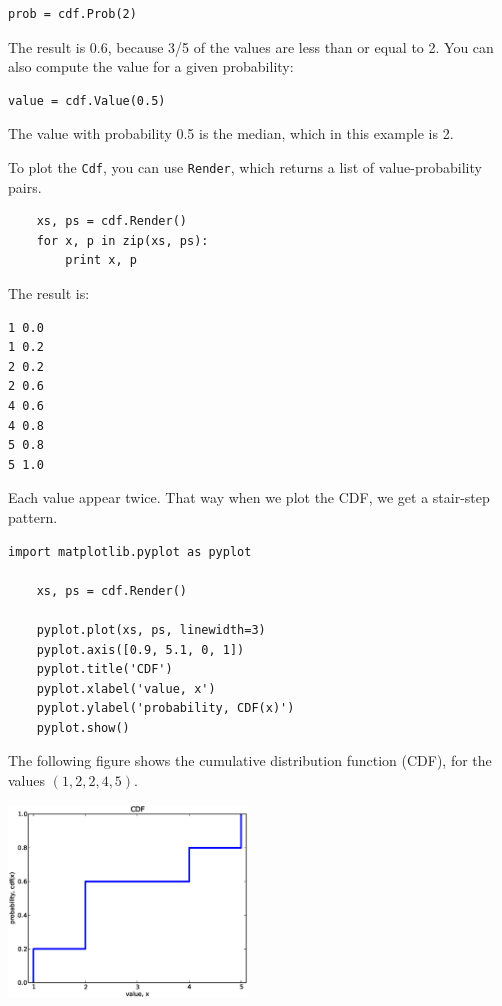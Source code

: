 \documentclass[10pt]{book}
\begin{document}
\begin{verbatim}
prob = cdf.Prob(2)
\end{verbatim}

The result is 0.6, because 3/5 of the values are less than or equal to 2.
You can also compute the value for a given probability:

\begin{verbatim}
value = cdf.Value(0.5)
\end{verbatim}

The value with probability 0.5 is the median, which in this example is 2.

To plot the {\tt Cdf}, you can use {\tt Render}, which returns
a list of value-probability pairs.

\begin{verbatim}
    xs, ps = cdf.Render()
    for x, p in zip(xs, ps):
        print x, p
\end{verbatim}

The result is:

\begin{verbatim}
1 0.0
1 0.2
2 0.2
2 0.6
4 0.6
4 0.8
5 0.8
5 1.0
\end{verbatim}

Each value appear twice.  That way when we plot the
CDF, we get a stair-step pattern.

\begin{verbatim}
import matplotlib.pyplot as pyplot

    xs, ps = cdf.Render()

    pyplot.plot(xs, ps, linewidth=3)
    pyplot.axis([0.9, 5.1, 0, 1])
    pyplot.title('CDF')
    pyplot.xlabel('value, x')
    pyplot.ylabel('probability, CDF(x)')
    pyplot.show()
\end{verbatim}

The following figure shows the cumulative distribution
function (CDF), for the values $(1,2,2,4,5)$.

\beforefig
\centerline{\includegraphics[width=2.5in]{figs/cdf_example.eps}}
\afterfig
\end{document}
